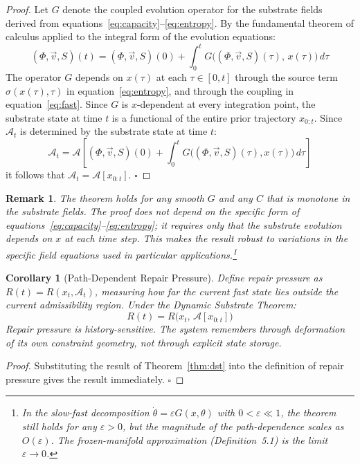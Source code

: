 \documentclass[12pt,a4paper]{article}
\newtheorem{corollary}[theorem]{Corollary}
\newtheorem{remark}[theorem]{Remark}
\begin{document}
\begin{proof}
Let $G$ denote the coupled evolution operator for the substrate fields derived from equations~\eqref{eq:capacity}--\eqref{eq:entropy}. By the fundamental theorem of calculus applied to the integral form of the evolution equations:
\[
(\Phi, \vec{v}, S)(t) = (\Phi, \vec{v}, S)(0) + \int_0^t G\bigl((\Phi, \vec{v}, S)(\tau),\, x(\tau)\bigr)\, d\tau
\]
The operator $G$ depends on $x(\tau)$ at each $\tau \in [0,t]$ through the source term $\sigma(x(\tau),\tau)$ in equation~\eqref{eq:entropy}, and through the coupling in equation~\eqref{eq:fast}. Since $G$ is $x$-dependent at every integration point, the substrate state at time $t$ is a functional of the entire prior trajectory $x_{0:t}$. Since $\mathcal{A}_t$ is determined by the substrate state at time $t$:
\[
\mathcal{A}_t = \mathcal{A}\!\left[(\Phi,\vec{v},S)(0) + \int_0^t G\bigl((\Phi,\vec{v},S)(\tau),x(\tau)\bigr)\,d\tau\right]
\]
it follows that $\mathcal{A}_t = \mathcal{A}[x_{0:t}]$. $\square$
\end{proof}

\begin{remark}
The theorem holds for any smooth $G$ and any $C$ that is monotone in the substrate fields. The proof does not depend on the specific form of equations~\eqref{eq:capacity}--\eqref{eq:entropy}; it requires only that the substrate evolution depends on $x$ at each time step. This makes the result robust to variations in the specific field equations used in particular applications.\footnote{In the slow-fast decomposition $\dot\theta = \varepsilon G(x,\theta)$ with $0 < \varepsilon \ll 1$, the theorem still holds for any $\varepsilon > 0$, but the magnitude of the path-dependence scales as $O(\varepsilon)$. The frozen-manifold approximation (Definition~5.1) is the limit $\varepsilon \to 0$.}
\end{remark}

\begin{corollary}[Path-Dependent Repair Pressure]
\label{cor:repair}
Define repair pressure as $R(t) = R(x_t, \mathcal{A}_t)$, measuring how far the current fast state lies outside the current admissibility region. Under the Dynamic Substrate Theorem:
\[
R(t) = R\bigl(x_t,\, \mathcal{A}[x_{0:t}]\bigr)
\]
Repair pressure is history-sensitive. The system remembers through deformation of its own constraint geometry, not through explicit state storage.
\end{corollary}

\begin{proof}
Substituting the result of Theorem~\ref{thm:dst} into the definition of repair pressure gives the result immediately. $\square$
\end{proof}
\end{document}
